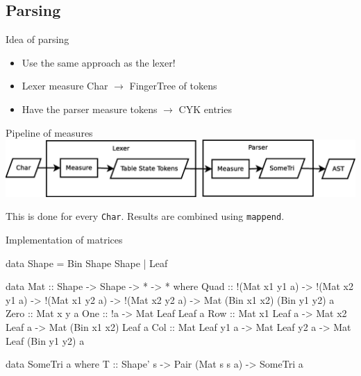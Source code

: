 \documentclass{beamer}
\begin{document}
\subsection{Parsing}
\begin{frame}{Idea of parsing}
    \begin{itemize}
        \item Use the same approach as the lexer!
        \item Lexer measure Char $\rightarrow$ FingerTree of tokens
        \item Have the parser measure tokens $\rightarrow$ CYK entries
    \end{itemize}
\end{frame}

\begin{frame}{Pipeline of measures}
\includegraphics[width=\textwidth]{pipeline.eps}

This is done for every \texttt{Char}. Results are combined using
\texttt{mappend}.
\end{frame}

\begin{frame}[fragile]{Implementation of matrices}
\begin{code}
data Shape = Bin Shape Shape | Leaf

data Mat :: Shape -> Shape -> * -> * where
  Quad :: !(Mat x1 y1 a) -> !(Mat x2 y1 a) ->
          !(Mat x1 y2 a) -> !(Mat x2 y2 a) ->
          Mat (Bin x1 x2) (Bin y1 y2) a
  Zero :: Mat x y a
  One :: !a -> Mat Leaf Leaf a
  Row :: Mat x1 Leaf a -> Mat x2 Leaf a -> Mat (Bin x1 x2) Leaf a
  Col :: Mat Leaf y1 a -> Mat Leaf y2 a -> Mat Leaf (Bin y1 y2) a

data SomeTri a where
  T :: Shape' s -> Pair (Mat s s a) -> SomeTri a
\end{code}
\end{frame}

\begin{frame}
\end{frame}

\begin{frame}
\end{frame}

\begin{frame}
\end{frame}
\end{document}
